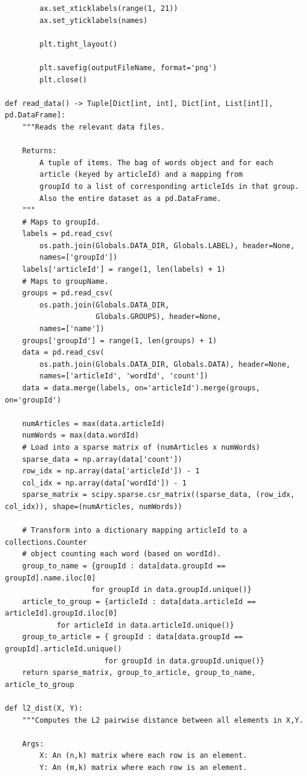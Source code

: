 \documentclass[12pt]{article}
\begin{document}
\begin{enumerate}[label=(\alph*)]
\begin{verbatim}
        ax.set_xticklabels(range(1, 21))
        ax.set_yticklabels(names)

        plt.tight_layout()

        plt.savefig(outputFileName, format='png')
        plt.close()

def read_data() -> Tuple[Dict[int, int], Dict[int, List[int]], pd.DataFrame]:
    """Reads the relevant data files.
    
    Returns:
        A tuple of items. The bag of words object and for each 
        article (keyed by articleId) and a mapping from
        groupId to a list of corresponding articleIds in that group.
        Also the entire dataset as a pd.DataFrame.
    """
    # Maps to groupId.
    labels = pd.read_csv(
        os.path.join(Globals.DATA_DIR, Globals.LABEL), header=None,
        names=['groupId'])
    labels['articleId'] = range(1, len(labels) + 1)
    # Maps to groupName.
    groups = pd.read_csv(
        os.path.join(Globals.DATA_DIR,
                     Globals.GROUPS), header=None,
        names=['name'])
    groups['groupId'] = range(1, len(groups) + 1)
    data = pd.read_csv(
        os.path.join(Globals.DATA_DIR, Globals.DATA), header=None,
        names=['articleId', 'wordId', 'count'])
    data = data.merge(labels, on='articleId').merge(groups, on='groupId')
    
    numArticles = max(data.articleId)
    numWords = max(data.wordId)
    # Load into a sparse matrix of (numArticles x numWords)
    sparse_data = np.array(data['count'])
    row_idx = np.array(data['articleId']) - 1
    col_idx = np.array(data['wordId']) - 1
    sparse_matrix = scipy.sparse.csr_matrix((sparse_data, (row_idx, col_idx)), shape=(numArticles, numWords))
    
    # Transform into a dictionary mapping articleId to a collections.Counter
    # object counting each word (based on wordId).
    group_to_name = {groupId : data[data.groupId == groupId].name.iloc[0]
                    for groupId in data.groupId.unique()}
    article_to_group = {articleId : data[data.articleId == articleId].groupId.iloc[0]
            for articleId in data.articleId.unique()}
    group_to_article = { groupId : data[data.groupId == groupId].articleId.unique()
                       for groupId in data.groupId.unique()}
    return sparse_matrix, group_to_article, group_to_name, article_to_group

def l2_dist(X, Y):
    """Computes the L2 pairwise distance between all elements in X,Y.
    
    Args:
        X: An (n,k) matrix where each row is an element.
        Y: An (m,k) matrix where each row is an element.
        

\end{verbatim}
\end{enumerate}
\end{document}

